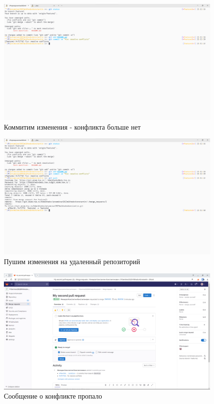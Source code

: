 \documentclass[a4paper]{article}
\begin{document}
  \begin{figure}[H]
    \centering
    \includegraphics[width=\textwidth]{1_ (7)}
    \caption{Коммитим изменения - конфликта больше нет}
  \end{figure}

  \begin{figure}[H]
    \centering
    \includegraphics[width=\textwidth]{1_ (6)}
    \caption{Пушим изменения на удаленный репозиторий}
  \end{figure}

  \begin{figure}[H]
    \centering
    \includegraphics[width=\textwidth]{1_ (5)}
    \caption{Сообщение о конфликте пропало}
  \end{figure}
\end{document}
